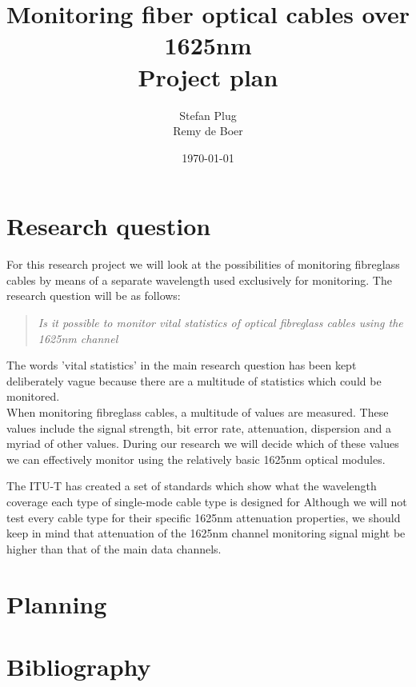 \documentclass{article}
\begin{document}
\title{Monitoring fiber optical cables over 1625nm\\Project plan}
\author{Stefan Plug\\Remy de Boer}
\date{\today}
\maketitle

\section{Research question}
For this research project we will look at the possibilities of monitoring fibreglass cables by means of a separate wavelength used exclusively for monitoring.
The research question will be as follows:
\begin{quote}
\textit{
Is it possible to monitor vital statistics of optical fibreglass cables using the 1625nm channel
}
\end{quote}

The words 'vital statistics' in the main research question has been kept deliberately vague because there are a multitude of statistics which could be monitored.\\
When monitoring fibreglass cables, a multitude of values are measured.
These values include the signal strength, bit error rate, attenuation, dispersion and a myriad of other values.
During our research we will decide which of these values we can effectively monitor using the relatively basic 1625nm optical modules.

The ITU-T has created a set of standards which show what the wavelength coverage each type of single-mode cable type is designed for \cite[p.~21]{refguide:2011} 
Although we will not test every cable type for their specific 1625nm attenuation properties, we should keep in mind that attenuation of the 1625nm channel monitoring signal might be higher than that of the main data channels.





\section{Planning}

\section{Bibliography}


\end{document}
